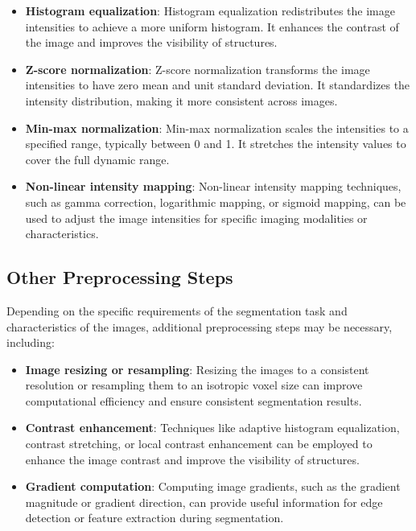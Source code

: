 \documentclass[]{report}
\begin{document}
\begin{itemize}
\item \textbf{Histogram equalization}: Histogram equalization redistributes the image intensities to achieve a more uniform histogram. It enhances the contrast of the image and improves the visibility of structures.

\item \textbf{Z-score normalization}: Z-score normalization transforms the image intensities to have zero mean and unit standard deviation. It standardizes the intensity distribution, making it more consistent across images.

\item \textbf{Min-max normalization}: Min-max normalization scales the intensities to a specified range, typically between 0 and 1. It stretches the intensity values to cover the full dynamic range.

\item \textbf{Non-linear intensity mapping}: Non-linear intensity mapping techniques, such as gamma correction, logarithmic mapping, or sigmoid mapping, can be used to adjust the image intensities for specific imaging modalities or characteristics.
\end{itemize}

\subsection*{Other Preprocessing Steps}

Depending on the specific requirements of the segmentation task and characteristics of the images, additional preprocessing steps may be necessary, including:

\begin{itemize}
\item \textbf{Image resizing or resampling}: Resizing the images to a consistent resolution or resampling them to an isotropic voxel size can improve computational efficiency and ensure consistent segmentation results.

\item \textbf{Contrast enhancement}: Techniques like adaptive histogram equalization, contrast stretching, or local contrast enhancement can be employed to enhance the image contrast and improve the visibility of structures.

\item \textbf{Gradient computation}: Computing image gradients, such as the gradient magnitude or gradient direction, can provide useful information for edge detection or feature extraction during segmentation.
\end{itemize}
\end{document}
